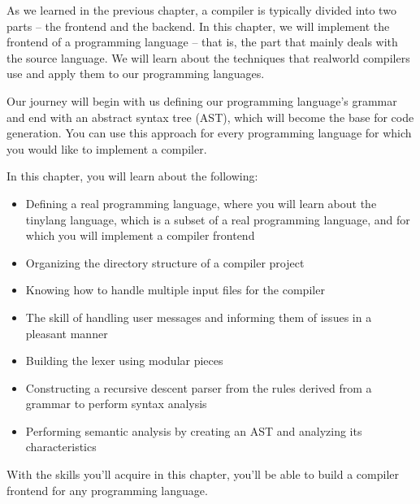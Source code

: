 As we learned in the previous chapter, a compiler is typically divided into two parts – the frontend and the backend. In this chapter, we will implement the frontend of a programming language – that is, the part that mainly deals with the source language. We will learn about the techniques that realworld compilers use and apply them to our programming languages.

Our journey will begin with us defining our programming language’s grammar and end with an abstract syntax tree (AST), which will become the base for code generation. You can use this approach for every programming language for which you would like to implement a compiler.

In this chapter, you will learn about the following:

\begin{itemize}
\item
Defining a real programming language, where you will learn about the tinylang language, which is a subset of a real programming language, and for which you will implement a compiler frontend

\item
Organizing the directory structure of a compiler project

\item
Knowing how to handle multiple input files for the compiler

\item
The skill of handling user messages and informing them of issues in a pleasant manner

\item
Building the lexer using modular pieces

\item
Constructing a recursive descent parser from the rules derived from a grammar to perform syntax analysis

\item
Performing semantic analysis by creating an AST and analyzing its characteristics
\end{itemize}

With the skills you’ll acquire in this chapter, you’ll be able to build a compiler frontend for any programming language.








